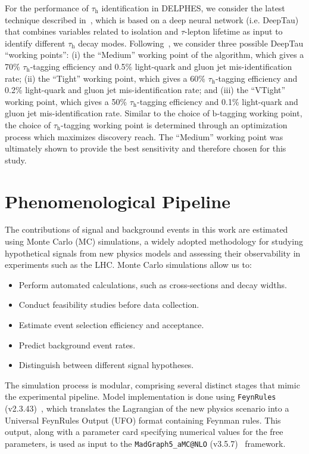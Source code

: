 For the performance of $\tau_{\textrm{h}}$ identification in DELPHES, we consider the latest technique described in~\parencite{CMS_DeepTau}, which is based on a deep neural network (i.e. DeepTau) that combines variables related to isolation and $\tau$-lepton lifetime as input to identify different $\tau_{\textrm{h}}$ decay modes. Following~\parencite{CMS_DeepTau}, we consider three possible DeepTau ``working points'': (i) the ``Medium'' working point of the algorithm, which gives a 70\% $\tau_{\textrm{h}}$-tagging efficiency and 0.5\% light-quark and gluon jet mis-identification rate; (ii) the ``Tight'' working point, which gives a 60\% $\tau_{\textrm{h}}$-tagging efficiency and 0.2\% light-quark and gluon jet mis-identification rate; and (iii) the ``VTight'' working point, which gives a 50\% $\tau_{\textrm{h}}$-tagging efficiency and 0.1\% light-quark and gluon jet mis-identification rate. Similar to the choice of $\textrm{b}$-tagging working point, the choice of $\tau_{\textrm{h}}$-tagging working point is determined through an optimization process which maximizes discovery reach. The ``Medium'' working point was ultimately shown to provide the best sensitivity and therefore chosen for this study. 

\section{Phenomenological Pipeline}

The contributions of signal and background events in this work are estimated using Monte Carlo (MC) simulations, a widely adopted methodology for studying hypothetical signals from new physics models and assessing their observability in experiments such as the LHC. Monte Carlo simulations allow us to:

\begin{itemize}
    \item Perform automated calculations, such as cross-sections and decay widths.
    \item Conduct feasibility studies before data collection.
    \item Estimate event selection efficiency and acceptance.
    \item Predict background event rates.
    \item Distinguish between different signal hypotheses.
\end{itemize}

The simulation process is modular, comprising several distinct stages that mimic the experimental pipeline. Model implementation is done using \texttt{FeynRules} (v2.3.43)~\parencite{Christensen:2008py,Alloul:2013bka}, which translates the Lagrangian of the new physics scenario into a Universal FeynRules Output (UFO) format containing Feynman rules. This output, along with a parameter card specifying numerical values for the free parameters, is used as input to the \texttt{MadGraph5\_aMC@NLO} (v3.5.7)~\parencite{Alwall:2014bza,Alwall:2014hca} framework.

